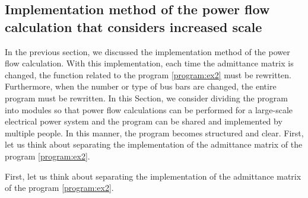 \documentclass[tombow,dvipdfmx]{corona-a5-1.1}
\begin{document}
\subsection{Implementation method of the power flow calculation that considers increased scale}
In the previous section, we discussed the implementation method of the power flow calculation.
With this implementation, each time the admittance matrix is changed, the function related to the program \ref{program:ex2} must be rewritten.
Furthermore, when the number or type of bus bars are changed, the entire program must be rewritten.
In this Section, we consider dividing the program into modules so that power flow calculations can be performed for a large-scale electrical power system and the program can be shared and implemented by multiple people.
In this manner, the program becomes structured and clear.
First, let us think about separating the implementation of the admittance matrix of the program \nobreak\ref{program:ex2}.

First, let us think about separating the implementation of the admittance matrix of the program \nobreak\ref{program:ex2}.
\end{document}

